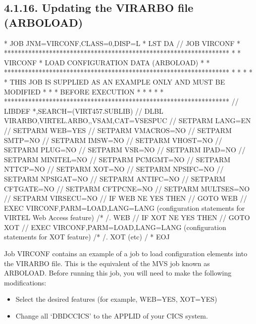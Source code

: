 \documentclass[letterpaper,10pt,english]{sphinxmanual}
\begin{document}
\subsection{4.1.16. Updating the VIRARBO file (ARBOLOAD)}
\label{\detokenize{Installation_Guide:updating-the-virarbo-file-arboload}}
\begin{sphinxVerbatim}[commandchars=\\\{\}]
* \PYGZdl{}\PYGZdl{} JOB JNM=VIRCONF,CLASS=0,DISP=L
* \PYGZdl{}\PYGZdl{} LST DA
// JOB VIRCONF
* *****************************************************************
* * VIRCONF * LOAD CONFIGURATION DATA (ARBOLOAD) *
* *****************************************************************
* * *
* * THIS JOB IS SUPPLIED AS AN EXAMPLE ONLY AND MUST BE MODIFIED *
* * BEFORE EXECUTION *
* * *
* *****************************************************************
// LIBDEF *,SEARCH=(VIRT457.SUBLIB)
// DLBL VIRARBO,\PYGZsq{}VIRTEL.ARBO\PYGZsq{},,VSAM,CAT=VSESPUC
// SETPARM LANG=EN
// SETPARM WEB=YES
// SETPARM VMACROS=NO
// SETPARM SMTP=NO
// SETPARM IMSW=NO
// SETPARM VHOST=NO
// SETPARM PLUG=NO
// SETPARM VSR=NO
// SETPARM IPAD=NO
// SETPARM MINITEL=NO
// SETPARM PCMGMT=NO
// SETPARM NTTCP=NO
// SETPARM XOT=NO
// SETPARM NPSIFC=NO
// SETPARM NPSIGAT=NO
// SETPARM ANTIFC=NO
// SETPARM CFTGATE=NO
// SETPARM CFTPCNE=NO
// SETPARM MULTSES=NO
// SETPARM VIRSECU=NO
// IF WEB NE YES THEN
// GOTO WEB
// EXEC VIRCONF,PARM=\PYGZsq{}LOAD,LANG=\PYGZam{}LANG\PYGZsq{}
  (configuration statements for VIRTEL Web Access feature)
/*
/. WEB
// IF XOT NE YES THEN
// GOTO XOT
// EXEC VIRCONF,PARM=\PYGZsq{}LOAD,LANG=\PYGZam{}LANG\PYGZsq{}
  (configuration statements for XOT feature)
/*
/. XOT
  (etc)
/\PYGZam{}
* \PYGZdl{}\PYGZdl{} EOJ
\end{sphinxVerbatim}


Job VIRCONF contains an example of a job to load configuration elements into the VIRARBO file. This is the equivalent of the MVS job known as ARBOLOAD. Before running this job, you will need to make the following modifications:
\begin{itemize}
\item {} 
Select the desired features (for example, WEB=YES, XOT=YES)

\item {} 
Change all ‘DBDCCICS’ to the APPLID of your CICS system.

\end{itemize}
\end{document}
